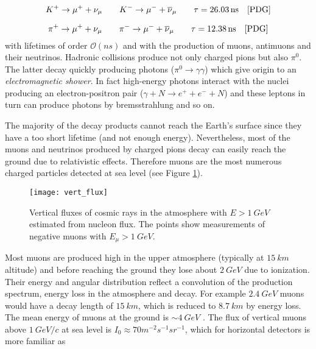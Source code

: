 \begin{equation}
K^+\rightarrow \mu^+ + \nu_{\mu} \qquad
K^-\rightarrow \mu^- + \overline \nu_{\mu} \qquad \tau = \SI{26.03}{ns} \quad \cite{PDG}
\end{equation}

\begin{equation}
\pi^+\rightarrow \mu^+ + \nu_{\mu} \qquad
\pi^-\rightarrow \mu^- + \overline \nu_{\mu} \qquad \tau = \SI{12.38}{ns} \quad \cite{PDG}
\end{equation}
with lifetimes of order $\mathcal{O} (\si{ns})$ and with the production of muons, antimuons and their neutrinos. 
Hadronic collisions produce not only charged pions but also $\pi^0$. The latter decay quickly producing photons ($\pi^0 \rightarrow \gamma \gamma$) which give origin to an \emph{electromagnetic shower}. In fact high-energy photons interact with the nuclei producing an electron-positron pair ($\gamma + N \rightarrow e^+ + e^- + N$) and these leptons in turn can produce photons by bremsstrahlung and so on.

The majority of the decay products cannot reach the Earth's surface since they have a too short lifetime (and not enough energy).
Nevertheless, most of the muons and neutrinos produced by charged pions decay can easily reach the ground due to relativistic effects. 
Therefore muons are the most numerous charged particles
detected at sea level (see Figure \ref{secondary_composition}).
\begin{figure}[!h]
	\centering
	\texttt{[image: vert\_flux]} 
	\caption{Vertical fluxes of cosmic rays in the atmosphere with $E > \SI{1}{GeV}$ estimated from nucleon flux. The points show measurements of negative muons with $E_{\mu} > \SI{1}{GeV}$.} \label{secondary_composition}
\end{figure}

Most muons are produced high in the upper atmosphere (typically at $\SI{15}{km}$ altitude) and before reaching the ground they lose about $\SI{2}{GeV}$ due to ionization. Their energy and angular distribution
reflect a convolution of the production spectrum, energy loss in
the atmosphere and decay. 
For example $\SI{2.4}{GeV}$ muons would have a decay length of $\SI{15}{km}$, which is reduced to $\SI{8.7}{km}$ by energy loss.
The mean energy of muons at the ground is $\sim \SI{4}{GeV}$ \cite{PDG}.
The flux of vertical muons above $\SI{1}{GeV/c}$ at sea level is $ I_0 \approx 70 \si{m^{-2}} \si{s^{-1}} \si{sr^{-1}}$, which for horizontal detectors is more familiar as

